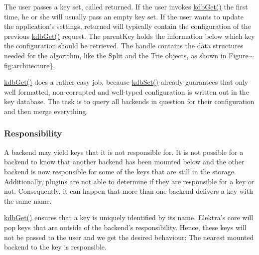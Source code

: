 The user passes a key set, called {\ttfamily returned}. If the user invokes {\ttfamily \hyperlink{group__kdb_ga28e385fd9cb7ccfe0b2f1ed2f62453a1}{kdb\+Get()}} the first time, he or she will usually pass an empty key set. If the user wants to update the application's settings, {\ttfamily returned} will typically contain the configuration of the previous {\ttfamily \hyperlink{group__kdb_ga28e385fd9cb7ccfe0b2f1ed2f62453a1}{kdb\+Get()}} request. The {\ttfamily parent\+Key} holds the information below which key the configuration should be retrieved. The {\ttfamily handle} contains the data structures needed for the algorithm, like the {\ttfamily Split} and the {\ttfamily Trie} objects, as shown in Figure$\sim$fig\+:architecture\}.

{\ttfamily \hyperlink{group__kdb_ga28e385fd9cb7ccfe0b2f1ed2f62453a1}{kdb\+Get()}} does a rather easy job, because {\ttfamily \hyperlink{group__kdb_ga11436b058408f83d303ca5e996832bcf}{kdb\+Set()}} already guarantees that only well formatted, non-\/corrupted and well-\/typed configuration is written out in the key database. The task is to query all backends in question for their configuration and then merge everything.

\subsubsection*{Responsibility}

A backend may yield keys that it is not responsible for. It is not possible for a backend to know that another backend has been mounted below and the other backend is now responsible for some of the keys that are still in the storage. Additionally, plugins are not able to determine if they are responsible for a key or not. Consequently, it can happen that more than one backend delivers a key with the same name.

{\ttfamily \hyperlink{group__kdb_ga28e385fd9cb7ccfe0b2f1ed2f62453a1}{kdb\+Get()}} ensures that a key is uniquely identified by its name. Elektra's core will pop keys that are outside of the backend's responsibility. Hence, these keys will not be passed to the user and we get the desired behaviour\+: The nearest mounted backend to the key is responsible.


